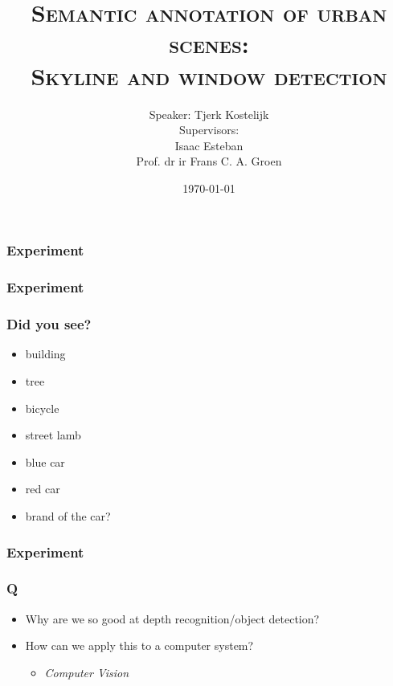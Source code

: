 \documentclass{beamer}
\title{\textsc{Semantic annotation of urban scenes:\\Skyline and window detection}}
\subtitle{\vspace{0.5cm}Speaker: Tjerk Kostelijk\\ 
\vspace{1cm}
Supervisors: \\Isaac Esteban\\Prof. dr ir Frans C. A. Groen}
\date{\today}
\begin{document}


\frame{\titlepage}





\frame
{
	\frametitle{Experiment}
}


\frame
{
	\frametitle{Experiment}
}


\frame
{
}



\frame
{
	\frametitle{Did you see?}
	\begin{itemize}
		\item <+-| alert@+> building
		\item <+-| alert@+> tree
		\item <+-| alert@+> bicycle
		\item <+-| alert@+> street lamb
		\item <+-| alert@+> blue car
		\item <+-| alert@+> red car
		\item <+-| alert@+> brand of the car?
	\end{itemize}
}

\frame
{
	\frametitle{Experiment}
}


\frame
{
	\frametitle{Q}
	\begin{itemize}
	\item <+-| alert@+> Why are we so good at depth recognition/object detection?
	\item <+-| alert@+> How can we apply this to a computer system?
		\begin{itemize}
			\item <+-| alert@+> {\textit{Computer Vision}}
		\end{itemize}
	\end{itemize}
}
\end{document}
